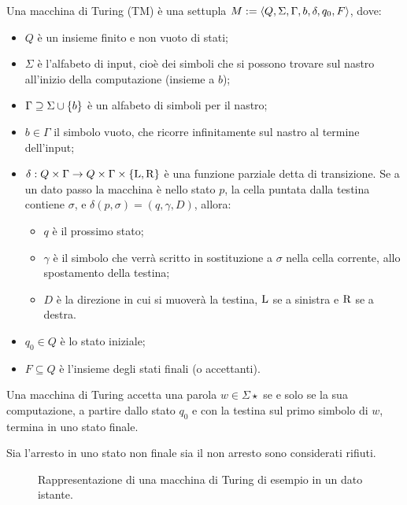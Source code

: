 \begin{defin}
	Una macchina di Turing (TM) è una settupla $M:=\langle Q,\Sigma,\Gamma,b,\delta,q_0,F \rangle$, dove:
	\begin{itemize}
		\item $Q$ è un insieme finito e non vuoto di stati;
		\item $\Sigma$ è l'alfabeto di input, cioè dei simboli che si possono trovare sul nastro all'inizio della computazione (insieme a $b$);
		\item $\Gamma\supseteq\Sigma\cup\left\{ b \right\}$ è un alfabeto di simboli per il nastro;
		\item $b\in\Gamma$ il simbolo vuoto, che ricorre infinitamente sul nastro al termine dell'input;
		\item $\delta:Q\times\Gamma\to Q\times\Gamma\times\left\{ \mathrm L,\mathrm R \right\}$ è una funzione parziale detta di transizione. Se a un dato passo la macchina è nello stato $p$, la cella puntata dalla testina contiene $\sigma$, e $\delta(p,\sigma)=(q,\gamma,D)$, allora:
		      \begin{itemize}
			      \item $q$ è il prossimo stato;
			      \item $\gamma$ è il simbolo che verrà scritto in sostituzione a $\sigma$ nella cella corrente, allo spostamento della testina;
			      \item $D$ è la direzione in cui si muoverà la testina, $\mathrm L$ se a sinistra e $\mathrm R$ se a destra.
		      \end{itemize}
		\item $q_0\in Q$ è lo stato iniziale;
		\item $F\subseteq Q$ è l'insieme degli stati finali (o accettanti).
	\end{itemize}
	Una macchina di Turing accetta una parola $w\in\Sigma\star$ se e solo se la sua computazione, a partire dallo stato $q_0$ e con la testina sul primo simbolo di $w$, termina in uno stato finale.
\end{defin}
\noindent Sia l'arresto in uno stato non finale sia il non arresto sono considerati rifiuti.

\begin{figure}
	\centering
	
	\caption{Rappresentazione di una macchina di Turing di esempio in un dato istante.}
\end{figure}

